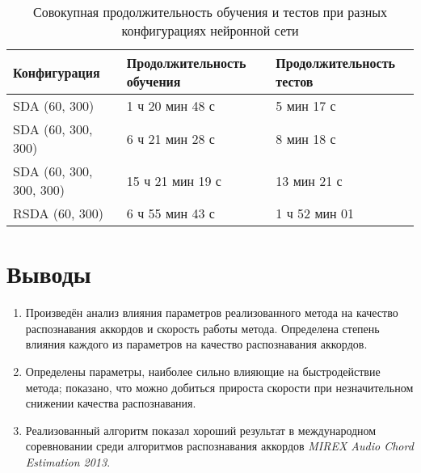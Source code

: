 \begin{table} [htbp]
  \centering
  \parbox{15cm}{\caption{Совокупная продолжительность обучения и тестов при
  разных конфигурациях нейронной сети}
  \label{TTimeConf}}
  \begin{tabular}{|l|l|l|}
  \hline
  Конфигурация & Продолжительность обучения & Продолжительность тестов \\
  \hline
  SDA (60, 300) & 1 ч 20 мин 48 с & 5 мин 17 с \\
  SDA (60, 300, 300) & 6 ч 21 мин 28 с & 8 мин 18 с \\
  SDA (60, 300, 300, 300) & 15 ч 21 мин 19 с & 13 мин 21 с \\
  RSDA (60, 300) & 6 ч 55 мин 43 с & 1 ч 52 мин 01 \\
  \hline
  \end{tabular}
\end{table}

\section{Выводы}

\begin{enumerate}
  \item Произведён анализ влияния параметров реализованного метода на качество
  распознавания аккордов и скорость работы метода. Определена степень влияния
  каждого из параметров на качество распознавания аккордов.
  \item Определены параметры, наиболее сильно влияющие на быстродействие метода;
  показано, что можно добиться прироста скорости при незначительном снижении
  качества распознавания.
  \item Реализованный алгоритм показал хороший результат в международном
  соревновании среди алгоритмов распознавания аккордов \emph{MIREX Audio Chord
  Estimation 2013}.
\end{enumerate}


\clearpage